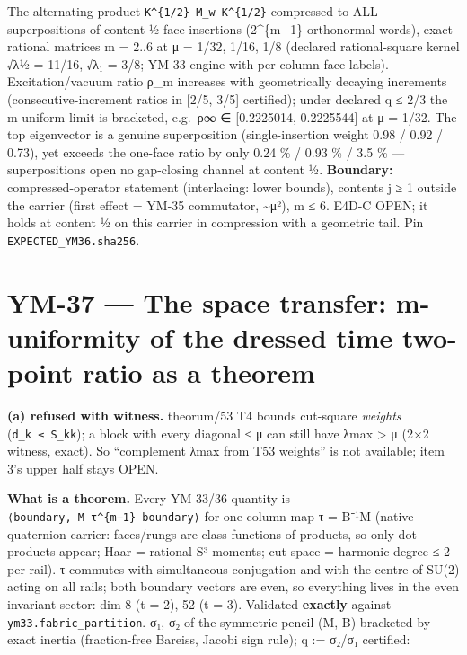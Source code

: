 The alternating product \texttt{K\^{}\{1/2\}\ M\_w\ K\^{}\{1/2\}} compressed to ALL superpositions of content-½ face insertions (2\^{}\{m−1\} orthonormal words), exact rational matrices m = 2..6 at μ = 1/32, 1/16, 1/8 (declared rational-square kernel √λ½ = 11/16, √λ₁ = 3/8; YM-33 engine with per-column face labels). Excitation/vacuum ratio ρ\_m increases with geometrically decaying increments (consecutive-increment ratios in {[}2/5, 3/5{]} certified); under declared q ≤ 2/3 the m-uniform limit is bracketed, e.g.~ρ∞ ∈ {[}0.2225014, 0.2225544{]} at μ = 1/32. The top eigenvector is a genuine superposition (single-insertion weight 0.98 / 0.92 / 0.73), yet exceeds the one-face ratio by only 0.24 \% / 0.93 \% / 3.5 \% --- superpositions open no gap-closing channel at content ½. \textbf{Boundary:} compressed-operator statement (interlacing: lower bounds), contents j ≥ 1 outside the carrier (first effect = YM-35 commutator, \textasciitilde μ²), m ≤ 6. E4D-C OPEN; it holds at content ½ on this carrier in compression with a geometric tail. Pin \texttt{EXPECTED\_YM36.sha256}.

\hypertarget{ym-37-the-space-transfer-m-uniformity-of-the-dressed-time-two-point-ratio-as-a-theorem}{%
\section{YM-37 --- The space transfer: m-uniformity of the dressed time two-point ratio as a theorem}\label{ym-37-the-space-transfer-m-uniformity-of-the-dressed-time-two-point-ratio-as-a-theorem}}

\textbf{(a) refused with witness.} theorum/53 T4 bounds cut-square \emph{weights} (\texttt{d\_k\ ≤\ S\_kk}); a block with every diagonal ≤ μ can still have λmax \textgreater{} μ (2×2 witness, exact). So ``complement λmax from T53 weights'' is not available; item 3's upper half stays OPEN.

\textbf{What is a theorem.} Every YM-33/36 quantity is \texttt{⟨boundary,\ M\ τ\^{}\{m−1\}\ boundary⟩} for one column map τ = B⁻¹M (native quaternion carrier: faces/rungs are class functions of products, so only dot products appear; Haar = rational S³ moments; cut space = harmonic degree ≤ 2 per rail). τ commutes with simultaneous conjugation and with the centre of SU(2) acting on all rails; both boundary vectors are even, so everything lives in the even invariant sector: dim 8 (t = 2), 52 (t = 3). Validated \textbf{exactly} against \texttt{ym33.fabric\_partition}. σ₁, σ₂ of the symmetric pencil (M, B) bracketed by exact inertia (fraction-free Bareiss, Jacobi sign rule); q := σ₂/σ₁ certified:

